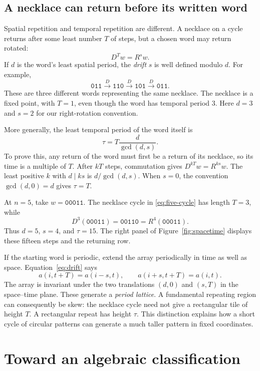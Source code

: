 \documentclass[11pt]{article}
\theoremstyle{definition}
\newcommand{\word}[1]{\mathtt{#1}}
\numberwithin{equation}{section}
\begin{document}
\subsection{A necklace can return before its written word}

Spatial repetition and temporal repetition are different. A necklace
on a cycle returns after some least number $T$ of steps, but a chosen
word may return rotated:
\begin{equation}\label{eq:drift}
 D^T w=R^s w.
\end{equation}
If $d$ is the word's least spatial period, the \emph{drift} $s$ is
well defined modulo $d$. For example,
\[
 \word{011}\xrightarrow{D}\word{110}
 \xrightarrow{D}\word{101}\xrightarrow{D}\word{011}.
\]
These are three different words representing the same necklace.
The necklace is a fixed point, with $T=1$, even though the word has
temporal period $3$. Here $d=3$ and $s=2$ for our right-rotation
convention.

More generally, the least temporal period of the word itself is
\begin{equation}\label{eq:word-period}
 \tau=T\frac d{\gcd(d,s)}.
\end{equation}
To prove this, any return of the word must first be a return of its
necklace, so its time is a multiple of $T$. After $kT$ steps,
commutation gives $D^{kT}w=R^{ks}w$. The least positive $k$ with
$d\mid ks$ is $d/\gcd(d,s)$. When $s=0$, the convention
$\gcd(d,0)=d$ gives $\tau=T$.

At $n=5$, take $w=\word{00011}$. The necklace cycle in
\eqref{eq:five-cycle} has length $T=3$, while
\[
 D^3(\word{00011})=\word{00110}=R^4(\word{00011}).
\]
Thus $d=5$, $s=4$, and $\tau=15$. The right panel of
Figure~\ref{fig:spacetime} displays these fifteen steps and the
returning row.

If the starting word is periodic, extend the array periodically in
time as well as space. Equation~\eqref{eq:drift} says
\[
 a(i,t+T)=a(i-s,t),
 \qquad a(i+s,t+T)=a(i,t).
\]
The array is invariant under the two translations $(d,0)$ and
$(s,T)$ in the space--time plane. These generate a \emph{period
lattice}. A fundamental repeating region can consequently be skew:
the necklace cycle need not give a rectangular tile of height $T$.
A rectangular repeat has height $\tau$. This distinction explains
how a short cycle of circular patterns can generate a much taller
pattern in fixed coordinates.

\section{Toward an algebraic classification}\label{sec:algebra}
\end{document}
